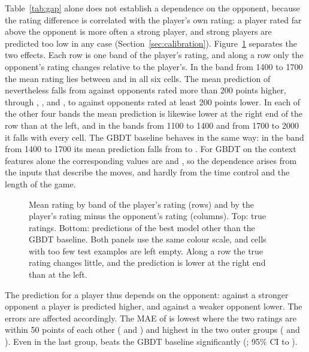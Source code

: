 \documentclass[11pt]{article}
\begin{document}
Table~\ref{tab:gap} alone does not establish a dependence on the opponent,
because the rating difference is correlated with the player's own rating: a
player rated far above the opponent is more often a strong player, and strong
players are predicted too low in any case (Section~\ref{sec:calibration}).
Figure~\ref{fig:grid} separates the two effects. Each row is one band of the
player's rating, and along a row only the opponent's rating changes relative
to the player's. In the band from 1400 to 1700 the mean rating lies between
 and
 in all six cells. The mean
prediction of  nevertheless falls from
 against opponents rated more than
200 points higher, through ,
,
 and
, to
 against opponents rated at least 200
points lower. In each of the other four bands the mean prediction is likewise
lower at the right end of the row than at the left, and in the bands from
1100 to 1400 and from 1700 to 2000 it falls with every cell. The GBDT
baseline behaves in the same way: in the band from 1400 to 1700 its mean
prediction falls from  to
. For GBDT on the context
features alone the corresponding values are
 and
, so the dependence arises
from the inputs that describe the moves, and hardly from the time control
and the length of the game.

\begin{figure}[htbp]\centering
{}

\medskip
{}
\caption{Mean rating by band of the player's rating (rows) and by the
player's rating minus the opponent's rating (columns). Top: true ratings.
Bottom: predictions of the best model other than the GBDT baseline. Both
panels use the same colour scale, and cells with too few test examples are
left empty. Along a row the true rating changes little, and the prediction
is lower at the right end than at the left.}
\label{fig:grid}
\end{figure}

The prediction for a player thus depends on the opponent: against a stronger
opponent a player is predicted higher, and against a weaker opponent lower.
The errors are affected accordingly. The MAE of  is lowest
where the two ratings are within 50 points of each other
( and ) and
highest in the two outer groups ( and
). Even in the last group, 
beats the GBDT baseline significantly (; 95\% CI
 to ).
\end{document}
